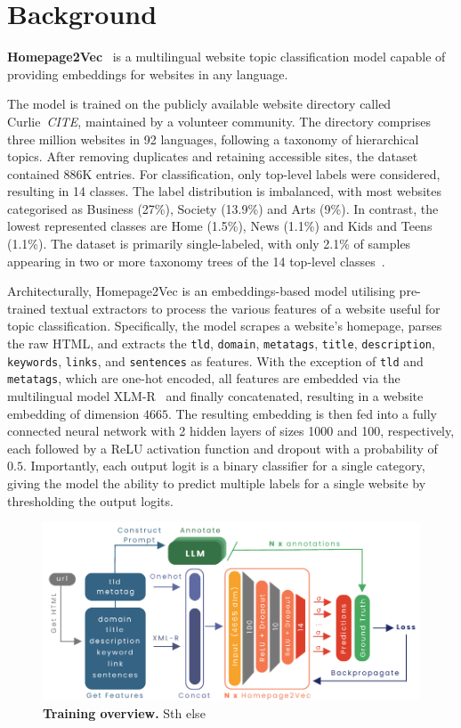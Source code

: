 \section{Background}\label{sec:background}

\textbf{Homepage2Vec}~\cite{homepage2vec} is a multilingual website topic classification model capable of providing embeddings for websites in any language. 

The model is trained on the publicly available website directory called Curlie~\textit{CITE}, maintained by a volunteer community. The directory comprises three million websites in 92 languages, following a taxonomy of hierarchical topics. After removing duplicates and retaining accessible sites, the dataset contained 886K entries. For classification, only top-level labels were considered, resulting in 14 classes. The label distribution is imbalanced, with most websites categorised as Business (27\%), Society (13.9\%) and Arts (9\%). In contrast, the lowest represented classes are Home (1.5\%), News (1.1\%) and Kids and Teens (1.1\%). The dataset is primarily single-labeled, with only 2.1\% of samples appearing in two or more taxonomy trees of the 14 top-level classes~\cite{homepage2vec}.

Architecturally, Homepage2Vec is an embeddings-based model utilising pre-trained textual extractors to process the various features of a website useful for topic classification. Specifically, the model scrapes a website's homepage, parses the raw HTML, and extracts the \texttt{tld}, \texttt{domain}, \texttt{metatags}, \texttt{title}, \texttt{description}, \texttt{keywords}, \texttt{links}, and \texttt{sentences} as features. With the exception of \texttt{tld} and \texttt{metatags}, which are one-hot encoded, all features are embedded via the multilingual model XLM-R~\cite{xmlr} and finally concatenated, resulting in a website embedding of dimension $4665$. The resulting embedding is then fed into a fully connected neural network with 2 hidden layers of sizes 1000 and 100, respectively, each followed by a ReLU activation function and dropout with a probability of $0.5$. Importantly, each output logit is a binary classifier for a single category, giving the model the ability to predict multiple labels for a single website by thresholding the output logits. 

\begin{figure}[!ht]
    \centering
    \includegraphics[height=0.2\textheight, width=\columnwidth]{./figures/training_overview.pdf}
    \caption{\textbf{Training overview.} Sth else}
    \label{fig:train-overview}
\end{figure}

